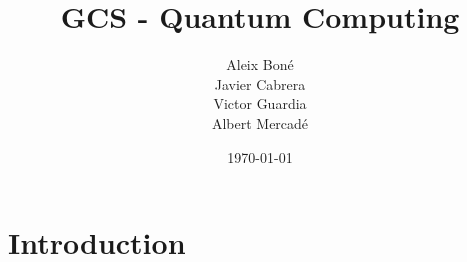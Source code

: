 

\title{
    GCS - Quantum Computing
}
\author {
    Aleix Boné\\
    Javier Cabrera\\
    Victor Guardia\\
    Albert Mercadé
}
\date{
    \today
}





\section{Introduction}%
\label{sec:introduction}



